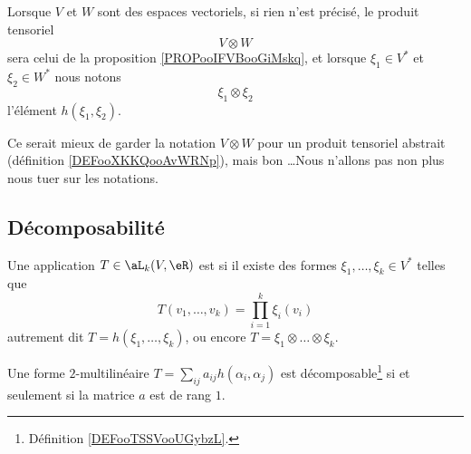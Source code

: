 \begin{normaltext}
	Lorsque \( V\) et \( W\) sont des espaces vectoriels, si rien n'est précisé, le produit tensoriel
	\begin{equation}
		V\otimes W
	\end{equation}
	sera celui de la proposition \ref{PROPooIFVBooGiMskq}, et lorsque \( \xi_1\in V^*\) et \( \xi_2\in W^*\) nous notons
	\begin{equation}
		\xi_1\otimes \xi_2
	\end{equation}
	l'élément \( h(\xi_1,\xi_2)\).

	Ce serait mieux de garder la notation \( V\otimes W\) pour un produit tensoriel abstrait (définition \ref{DEFooXKKQooAvWRNp}), mais bon \ldots Nous n'allons pas non plus nous tuer sur les notations.
\end{normaltext}

\subsection{Décomposabilité}

\begin{definition}		\label{DEFooTSSVooUGybzL}
	Une application \( T\in\aL_k(V,\eR)\) est  si il existe des formes \( \xi_1,\ldots,\xi_k\in V^*\) telles que
	\begin{equation}
		T(v_1,\ldots,v_k)=\prod_{i=1}^k\xi_i(v_i)
	\end{equation}
	autrement dit \( T=h(\xi_1,\ldots,\xi_k)\), ou encore \( T=\xi_1\otimes \ldots \otimes \xi_k\).
\end{definition}

\begin{lemma}		\label{LEMooLEIBooROVcim}
	Une forme \( 2\)-multilinéaire \( T=\sum_{ij}a_{ij}h(\alpha_i,\alpha_j)\) est décomposable\footnote{Définition \ref{DEFooTSSVooUGybzL}.} si et seulement si la matrice \( a\) est de rang \( 1\).
\end{lemma}


